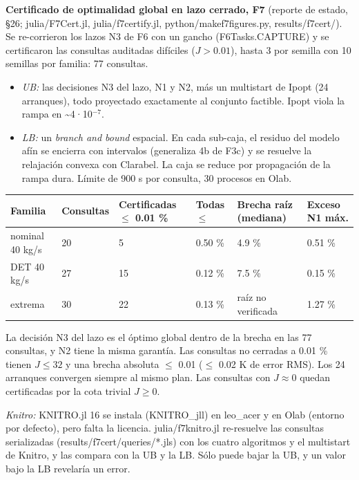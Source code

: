 \documentclass[11pt,a4paper]{article}
\newcommand{\codeus}{\textunderscore\allowbreak}
\newcommand{\code}[1]{{\small\ttfamily\let\_\codeus #1}}
\begin{document}
\textbf{Certificado de optimalidad global en lazo cerrado, F7} (reporte de estado, \S{}26; \code{julia/F7Cert.jl}, \code{julia/f7\_certify.jl}, \code{python/make\_f7\_figures.py}, \code{results/f7\_cert/}). Se re-corrieron los lazos N3 de F6 con un gancho (\code{F6Tasks.CAPTURE}) y se certificaron las consultas auditadas difíciles ($J>0.01$), hasta 3 por semilla con 10 semillas por familia: 77 consultas.

\begin{itemize}
\item \emph{UB:} las decisiones N3 del lazo, N1 y N2, más un multistart de Ipopt (24 arranques), todo proyectado exactamente al conjunto factible. Ipopt viola la rampa en \textasciitilde{}4·10$^{-7}$.
\item \emph{LB:} un \emph{branch and bound} espacial. En cada sub-caja, el residuo del modelo afín se encierra con intervalos (generaliza 4b de F3c) y se resuelve la relajación convexa con Clarabel. La caja se reduce por propagación de la rampa dura. Límite de 900 s por consulta, 30 procesos en Olab.
\end{itemize}

{\footnotesize
\begin{xltabular}{\linewidth}{@{}YYYYYY@{}}
\toprule
\textbf{Familia} & \textbf{Consultas} & \textbf{Certificadas $\le$ 0.01 \%} & \textbf{Todas $\le$} & \textbf{Brecha raíz (mediana)} & \textbf{Exceso N1 máx.} \\
\midrule
\endhead
nominal 40 kg/s & 20 & 5 & 0.50 \% & 4.9 \% & 0.51 \% \\
DET 40 kg/s & 27 & 15 & 0.12 \% & 7.5 \% & 0.15 \% \\
extrema & 30 & 22 & 0.13 \% & raíz no verificada & 1.27 \% \\
\bottomrule
\end{xltabular}}

La decisión N3 del lazo es el óptimo global dentro de la brecha en las 77 consultas, y N2 tiene la misma garantía. Las consultas no cerradas a 0.01 \% tienen $J\le32$ y una brecha absoluta $\le$ 0.01 ($\le$ 0.02 K de error RMS). Los 24 arranques convergen siempre al mismo plan. Las consultas con $J\approx0$ quedan certificadas por la cota trivial $J\ge0$.

\emph{Knitro:} KNITRO.jl 16 se instala (KNITRO\_jll) en leo\_acer y en Olab (entorno por defecto), pero falta la licencia. \code{julia/f7\_knitro.jl} re-resuelve las consultas serializadas (\code{results/f7\_cert/queries/*.jls}) con los cuatro algoritmos y el multistart de Knitro, y las compara con la UB y la LB. Sólo puede bajar la UB, y un valor bajo la LB revelaría un error.
\end{document}
